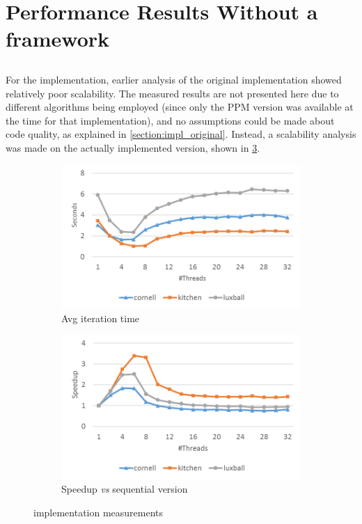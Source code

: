 \documentclass[main.tex]{subfiles}
\begin{document}
\section{Performance Results Without a framework} \label{sec:prof:cpu}

\subsection{\cpu}

For the \cpu implementation, earlier analysis of the original implementation showed relatively poor scalability. The measured results are not presented here due to different algorithms being employed (since only the PPM version was available at the time for that implementation), and no assumptions could be made about code quality, as explained in \cref{section:impl_original}.
Instead, a scalability analysis was made on the actually implemented \cpu version, shown in \cref{fig:prof:cpu}.

\begin{figure}[!htp]
  \centering
  \begin{subfigure}{.5\textwidth}
    \centering
    \includegraphics[width=\linewidth]{profiling/cpu_time}
    \caption{Avg iteration time \label{fig:prof:cpu_time}}
  \end{subfigure}%
  \begin{subfigure}{.5\textwidth}
    \centering
    \includegraphics[width=\linewidth]{profiling/cpu_speedup}
    \caption{Speedup \textit{vs} sequential version \label{fig:prof:cpu_speedup}}
  \end{subfigure}
  \caption{\cpu implementation measurements \label{fig:prof:cpu}}
\end{figure}
\end{document}

